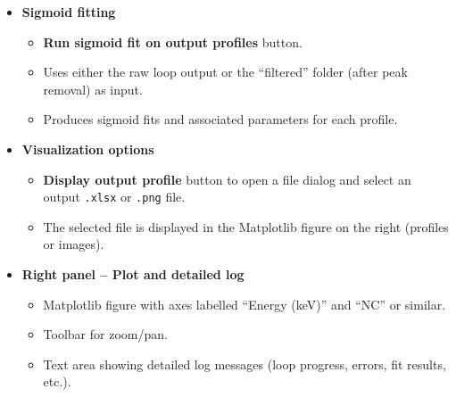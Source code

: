 \begin{itemize}
  \begin{itemize}
  \tightlist
  \item
    Input fields:

    \begin{itemize}
    \tightlist
    \item
      \textbf{Energy center (keV)}: resonance energy from which the
      build‑up peak is removed (default \textasciitilde6385 keV for the
      15N(H, α, γ)12C resonance).\\
    \item
      \textbf{Search window (keV)}: total energy window around the
      center where the peak search is performed.\\
    \item
      \textbf{Removal half‑width (keV)}: half‑width of the interval to
      be removed once a peak is detected.\\
    \end{itemize}
  \item
    \textbf{Remove build‑up peak} button to apply the removal to all
    profiles previously calculated by the loop.
  \end{itemize}
\item
  \textbf{Sigmoid fitting}

  \begin{itemize}
  \tightlist
  \item
    \textbf{Run sigmoid fit on output profiles} button.\\
  \item
    Uses either the raw loop output or the ``filtered'' folder (after
    peak removal) as input.\\
  \item
    Produces sigmoid fits and associated parameters for each profile.
  \end{itemize}
\item
  \textbf{Visualization options}

  \begin{itemize}
  \tightlist
  \item
    \textbf{Display output profile} button to open a file dialog and
    select an output \texttt{.xlsx} or \texttt{.png} file.\\
  \item
    The selected file is displayed in the Matplotlib figure on the right
    (profiles or images).
  \end{itemize}
\item
  \textbf{Right panel -- Plot and detailed log}

  \begin{itemize}
  \tightlist
  \item
    Matplotlib figure with axes labelled ``Energy (keV)'' and ``NC'' or
    similar.\\
  \item
    Toolbar for zoom/pan.\\
  \item
    Text area showing detailed log messages (loop progress, errors, fit
    results, etc.).
  \end{itemize}
\end{itemize}

